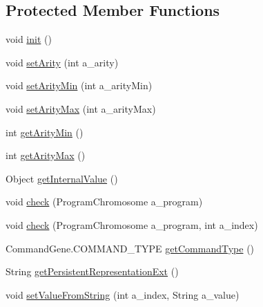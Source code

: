 \subsection*{Protected Member Functions}
\begin{DoxyCompactItemize}
\item 
void \hyperlink{classorg_1_1jgap_1_1gp_1_1_command_gene_a03f1904f942d1c53e85d038d110ca0da}{init} ()
\item 
void \hyperlink{classorg_1_1jgap_1_1gp_1_1_command_gene_a759f5ec6d53219ca2e5b7ae32408636c}{set\-Arity} (int a\-\_\-arity)
\item 
void \hyperlink{classorg_1_1jgap_1_1gp_1_1_command_gene_a6c1bdf5652728828b15a8cedc0ebe967}{set\-Arity\-Min} (int a\-\_\-arity\-Min)
\item 
void \hyperlink{classorg_1_1jgap_1_1gp_1_1_command_gene_a3b4e0282bdd590393e437e5cfd2fcd1a}{set\-Arity\-Max} (int a\-\_\-arity\-Max)
\item 
int \hyperlink{classorg_1_1jgap_1_1gp_1_1_command_gene_a786ac13a7091440afde2272257408803}{get\-Arity\-Min} ()
\item 
int \hyperlink{classorg_1_1jgap_1_1gp_1_1_command_gene_a498137ec405f98114565d0745667bacc}{get\-Arity\-Max} ()
\item 
Object \hyperlink{classorg_1_1jgap_1_1gp_1_1_command_gene_afc3e8a671fa57a62c513bc79e7671721}{get\-Internal\-Value} ()
\item 
void \hyperlink{classorg_1_1jgap_1_1gp_1_1_command_gene_ae035736365ad5b9d7e03094b412c2252}{check} (Program\-Chromosome a\-\_\-program)
\item 
void \hyperlink{classorg_1_1jgap_1_1gp_1_1_command_gene_ac2064797a1bcf3e683386727c704df4e}{check} (Program\-Chromosome a\-\_\-program, int a\-\_\-index)
\item 
Command\-Gene.\-C\-O\-M\-M\-A\-N\-D\-\_\-\-T\-Y\-P\-E \hyperlink{classorg_1_1jgap_1_1gp_1_1_command_gene_a0ed49662d3cd73975d9e311363c90989}{get\-Command\-Type} ()
\item 
String \hyperlink{classorg_1_1jgap_1_1gp_1_1_command_gene_a2edfe3b83bebde4b16bc9a30e3c9a1b7}{get\-Persistent\-Representation\-Ext} ()
\item 
void \hyperlink{classorg_1_1jgap_1_1gp_1_1_command_gene_a5483a1f55331eb699d680f251b42759d}{set\-Value\-From\-String} (int a\-\_\-index, String a\-\_\-value)
\end{DoxyCompactItemize}
